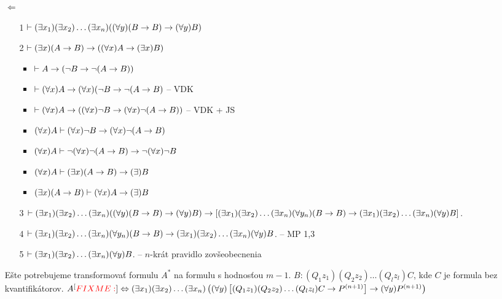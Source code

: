 \begin{dokaz}
\begin{itemize}
\begin{itemize}
            \vskip 0.5cm
        \item[$\Leftarrow$]
            \begin{itemize}
            \item[1] $\vdash (\exists x_1) (\exists x_2) \dots (\exists x_n) ((\forall y) (B \rightarrow B) 
                \rightarrow (\forall y) B)$
            \item[2] $\vdash (\exists x) (A \rightarrow B) \rightarrow
                ((\forall x) A \rightarrow (\exists x) B)$
                \begin{itemize}
                \item $\vdash A \rightarrow (\neg B \rightarrow \neg (A
                        \rightarrow B))$
                \item $\vdash (\forall x) A \rightarrow (\forall x) (\neg B
                   \rightarrow \neg (A \rightarrow B)$ -- VDK
                \item $\vdash (\forall x) A \rightarrow (
                    (\forall x) \neg B \rightarrow
                    (\forall x) \neg (A \rightarrow B))$ -- VDK + JS
                \item $(\forall x) A \vdash
                    (\forall x) \neg B \rightarrow
                    (\forall x) \neg (A \rightarrow B)$
                \item $(\forall x) A \vdash
                    \neg (\forall x) \neg (A \rightarrow B) \rightarrow
                    \neg (\forall x) \neg B$
                \item $(\forall x) A \vdash
                    (\exists x) (A \rightarrow B) \rightarrow
                    (\exists) B$
                \item $(\exists x) (A \rightarrow B) \vdash
                     (\forall x) A  \rightarrow
                    (\exists) B$
                \end{itemize}
            \item[3] $\vdash (\exists x_1) (\exists x_2) \dots (\exists x_n) ((\forall y) (B \rightarrow B) 
                \rightarrow  (\forall y) B) \rightarrow
                [ (\exists x_1) (\exists x_2) \dots (\exists x_n) (\forall y_n) (B \rightarrow B)
                \rightarrow (\exists x_1) (\exists x_2) \dots (\exists x_n) (\forall y) B]$.
            \item[4] $\vdash (\exists x_1) (\exists x_2) \dots (\exists x_n) (\forall y_n) (B \rightarrow B)
                \rightarrow (\exists x_1) (\exists x_2) \dots (\exists x_n) (\forall y) B$.
            -- MP 1,3
            \item[5]
                $\vdash (\exists x_1) (\exists x_2) \dots (\exists x_n) (\forall y) B$.
            -- $n$-krát pravidlo zovšeobecnenia
            \end{itemize}
            Ešte potrebujeme transformovať formulu $A^*$ na formulu s
            hodnosťou $m-1$.
            $B: (Q_1 z_1)(Q_2 z_2) \dots (Q_l z_l) C$, kde $C$ je formula
            bez kvantifikátorov.
            $A^[{\color{red} FIXME:} {\bf }] \Leftrightarrow (\exists x_1) (\exists x_2) \dots (\exists x_n) \left( (\forall y)
                \left[ (Q_1 z_1) (Q_2 z_2) \dots (Q_l z_l) C \rightarrow
                  P^{(n+1)} \right] \rightarrow (\forall y) P^{(n+1)}\right)$


\end{itemize}
\end{itemize}
\end{dokaz}
